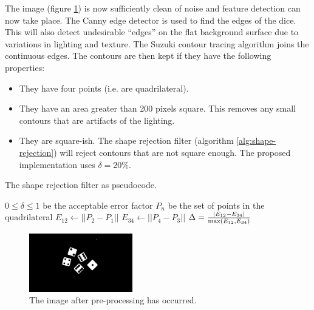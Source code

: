 \documentclass[conference]{IEEEtran}
\begin{document}
The image (figure \ref{fig:blurred}) is now sufficiently clean of noise and feature detection can now take place.
The Canny edge detector \cite{Canny1986} is used to find the edges of the dice.
This will also detect undesirable ``edges'' on the flat background surface due to variations in lighting and texture.
The Suzuki contour tracing algorithm \cite{Suzuki1985} joins the continuous edges.
The contours are then kept if they have the following properties:
\begin{itemize}
	\item They have four points (i.e. are quadrilateral).
	\item They have an area greater than 200 pixels square. This removes any small contours that are artifacts of the lighting.
	\item They are square-ish. The shape rejection filter (algorithm \ref{alg:shape-rejection}) will reject contours that are not square enough. The proposed implementation uses $\delta = 20\%$.
\end{itemize}
\begin{algorithm}
	\caption{The shape rejection filter as pseudocode.}
	\label{alg:shape-rejection}
	\begin{algorithmic}
		\REQUIRE $0 \leq \delta \leq 1$ be the acceptable error factor
		\REQUIRE $P_n$ be the set of points in the quadrilateral
		\STATE $E_{12} \leftarrow ||P_2 - P_1||$
		\STATE $E_{34} \leftarrow ||P_4 - P_3||$
		\STATE $\Delta = \frac{|E_{12} - E_{34}|}{\textnormal{max}(E_{12}, E_{34})}$
		\IF {$\Delta \leq \delta$} \RETURN \TRUE \ELSE \RETURN \FALSE \ENDIF
	\end{algorithmic}
\end{algorithm}
\begin{figure}
	\centering
	\includegraphics[width=0.4\textwidth]{blur}
	\caption{The image after pre-processing has occurred.}
	\label{fig:blurred}
\end{figure}
%		
%
\end{document}
